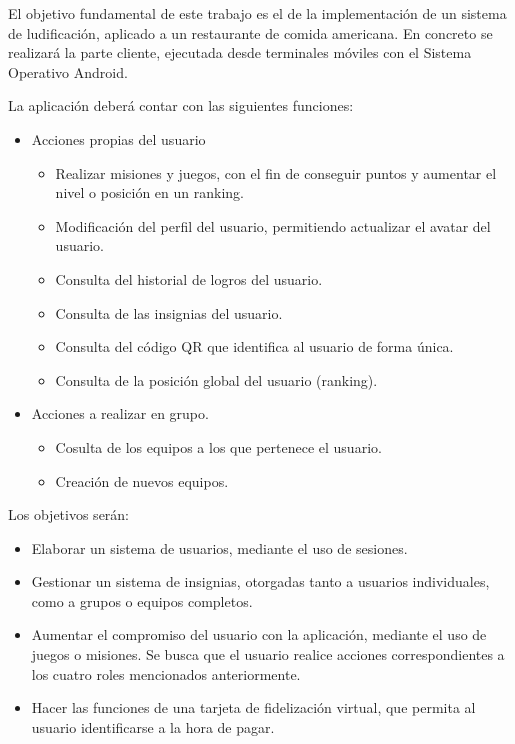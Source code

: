 \documentclass[twoside]{report}
\begin{document}
El objetivo fundamental de  este trabajo es el de la implementación de un sistema de ludificación, aplicado a un restaurante de comida americana. En concreto se realizará la parte cliente, ejecutada desde terminales móviles con el Sistema Operativo Android.

La aplicación deberá contar con las siguientes funciones:
\begin{itemize}
\item Acciones propias del usuario
	\begin{itemize}
	\item Realizar misiones y juegos, con el fin de conseguir puntos y aumentar el nivel o posición en un ranking.
	\item Modificación del perfil del usuario, permitiendo actualizar el avatar del usuario.
	\item Consulta del historial de logros del usuario.
	\item Consulta de las insignias del usuario.
	\item Consulta del código QR que identifica al usuario de forma única.
	\item Consulta de la posición global del usuario (ranking).
	\end{itemize}
\item Acciones a realizar en grupo.
	\begin{itemize}
	\item Cosulta de los equipos a los que pertenece el usuario.
	\item Creación de nuevos equipos.
	\end{itemize}
\end{itemize}

Los objetivos serán:
\begin{itemize}
	\item Elaborar un sistema de usuarios, mediante el uso de sesiones.
	\item Gestionar un sistema de insignias, otorgadas tanto a usuarios individuales, como a grupos o equipos completos.
	\item Aumentar el compromiso del usuario con la aplicación, mediante el uso de juegos o misiones. Se busca que el usuario realice acciones correspondientes a los cuatro roles mencionados anteriormente.
	\item Hacer las funciones de una tarjeta de fidelización virtual, que permita al usuario identificarse a la hora de pagar.
\end{itemize}
\end{document}

